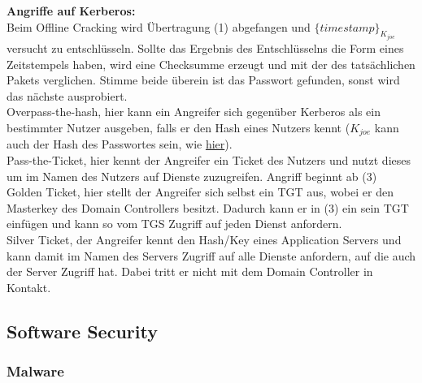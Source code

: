 \documentclass[a4paper,12pt,leqno]{article}
\begin{document}
\textbf{Angriffe auf Kerberos:}\\

Beim Offline Cracking wird Übertragung (1) abgefangen und $\{timestamp\}_{K_{joe}}$ versucht zu entschlüsseln. Sollte das Ergebnis des Entschlüsselns die Form eines Zeitstempels haben, wird eine Checksumme erzeugt und mit der des tatsächlichen Pakets verglichen. Stimme beide überein ist das Passwort gefunden, sonst wird das nächste ausprobiert.\\

Overpass-the-hash, hier kann ein Angreifer sich gegenüber Kerberos als ein bestimmter Nutzer ausgeben, falls er den Hash eines Nutzers kennt ($K_{joe}$ kann auch der Hash des Passwortes sein, wie \hyperref[figure:CHAP]{hier}).\\

Pass-the-Ticket, hier kennt der Angreifer ein Ticket des Nutzers und nutzt dieses um im Namen des Nutzers auf Dienste zuzugreifen. Angriff beginnt ab (3)\\

Golden Ticket, hier stellt der Angreifer sich selbst ein TGT aus, wobei er den Masterkey des Domain Controllers besitzt. Dadurch kann er in (3) ein sein TGT einfügen und kann so vom TGS Zugriff auf jeden Dienst anfordern.\\

Silver Ticket, der Angreifer kennt den Hash/Key eines Application Servers und kann damit im Namen des Servers Zugriff auf alle Dienste anfordern, auf die auch der Server Zugriff hat.
Dabei tritt er nicht mit dem Domain Controller in Kontakt.

\subsection{Software Security}

\subsubsection{Malware}
\end{document}
